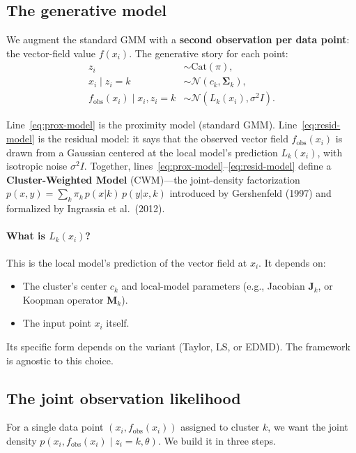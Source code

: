 \documentclass[11pt]{article}
\theoremstyle{definition}
\theoremstyle{plain}
\theoremstyle{remark}
\newcommand{\Sv}{\boldsymbol{\Sigma}}
\newcommand{\Jv}{\boldsymbol{J}}
\newcommand{\Mv}{\boldsymbol{M}}
\begin{document}
\subsection{The generative model}

We augment the standard GMM with a \textbf{second observation per data point}: the vector-field value $f(x_i)$. The generative story for each point:
\begin{align}
  z_i &\sim \mathrm{Cat}(\pi), \\
  x_i \mid z_i=k &\sim \mathcal{N}(c_k,\Sv_k), \label{eq:prox-model} \\
  f_{\mathrm{obs}}(x_i) \mid x_i,z_i=k &\sim \mathcal{N}(L_k(x_i),\sigma^2 I). \label{eq:resid-model}
\end{align}

Line~\eqref{eq:prox-model} is the proximity model (standard GMM). Line~\eqref{eq:resid-model} is the residual model: it says that the observed vector field $f_{\mathrm{obs}}(x_i)$ is drawn from a Gaussian centered at the local model's prediction $L_k(x_i)$, with isotropic noise $\sigma^2 I$. Together, lines~\eqref{eq:prox-model}--\eqref{eq:resid-model} define a \textbf{Cluster-Weighted Model} (CWM)---the joint-density factorization $p(x,y)=\sum_k\pi_k\,p(x|k)\,p(y|x,k)$ introduced by Gershenfeld (1997) and formalized by Ingrassia et al.\ (2012).

\paragraph{What is $L_k(x_i)$?} This is the local model's prediction of the vector field at $x_i$. It depends on:
\begin{itemize}[leftmargin=*,itemsep=0pt]
  \item The cluster's center $c_k$ and local-model parameters (e.g., Jacobian $\Jv_k$, or Koopman operator $\Mv_k$).
  \item The input point $x_i$ itself.
\end{itemize}
Its specific form depends on the variant (Taylor, LS, or EDMD). The framework is agnostic to this choice.

\subsection{The joint observation likelihood}

For a single data point $(x_i, f_{\mathrm{obs}}(x_i))$ assigned to cluster $k$, we want the joint density $p(x_i, f_{\mathrm{obs}}(x_i)\mid z_i=k,\theta)$. We build it in three steps.
\end{document}
